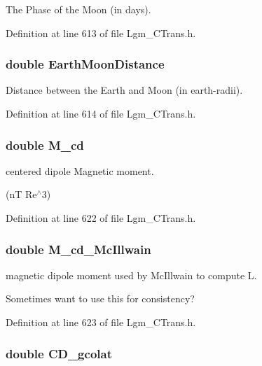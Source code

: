 The Phase of the Moon (in days). 



Definition at line 613 of file Lgm\_\-CTrans.h.\hypertarget{struct_lgm___c_trans_cf0375085710ac389d2bec865d0fe059}{
\subsubsection[{EarthMoonDistance}]{\setlength{\rightskip}{0pt plus 5cm}double {\bf EarthMoonDistance}}}
\label{struct_lgm___c_trans_cf0375085710ac389d2bec865d0fe059}


Distance between the Earth and Moon (in earth-radii). 



Definition at line 614 of file Lgm\_\-CTrans.h.\hypertarget{struct_lgm___c_trans_f70c8accde2f7cb1977db97dc8f3ad9e}{
\subsubsection[{M\_\-cd}]{\setlength{\rightskip}{0pt plus 5cm}double {\bf M\_\-cd}}}
\label{struct_lgm___c_trans_f70c8accde2f7cb1977db97dc8f3ad9e}


centered dipole Magnetic moment. 

(nT Re$^\wedge$3) 

Definition at line 622 of file Lgm\_\-CTrans.h.\hypertarget{struct_lgm___c_trans_2cfdfbacf9fe8b4ab1ad122903c54619}{
\subsubsection[{M\_\-cd\_\-McIllwain}]{\setlength{\rightskip}{0pt plus 5cm}double {\bf M\_\-cd\_\-McIllwain}}}
\label{struct_lgm___c_trans_2cfdfbacf9fe8b4ab1ad122903c54619}


magnetic dipole moment used by McIllwain to compute L. 

Sometimes want to use this for consistency? 

Definition at line 623 of file Lgm\_\-CTrans.h.\hypertarget{struct_lgm___c_trans_d1dc347c863f31e708763ed3f8731173}{
\subsubsection[{CD\_\-gcolat}]{\setlength{\rightskip}{0pt plus 5cm}double {\bf CD\_\-gcolat}}}
\label{struct_lgm___c_trans_d1dc347c863f31e708763ed3f8731173}


